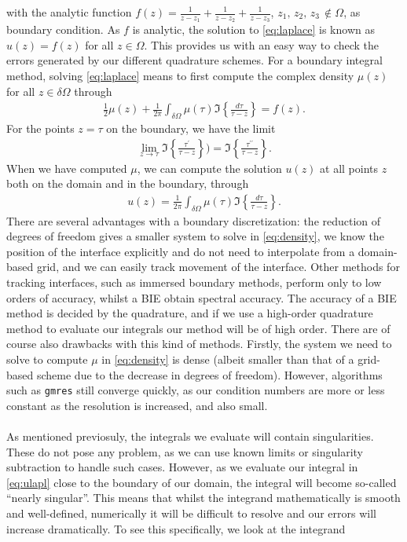 \documentclass[a4paper,10pt]{article}
\begin{document}
with the analytic function $f(z)=\frac{1}{z-z_1}+\frac{1}{z-z_2} + \frac{1}{z-z_3}$, $z_1,\,z_2,\,z_3\,\notin\Omega$, as boundary condition. As $f$ is analytic, the solution to \eqref{eq:laplace} is known as $u(z)=f(z)$ for all $z\in\Omega$. This provides us with an easy way to check the errors generated by our different quadrature schemes. For a boundary integral method, solving \eqref{eq:laplace} means to first compute the complex density $\mu(z)$ for all $z\in\delta\Omega$ through
\begin{align}
	\frac{1}{2}\mu(z) + \frac{1}{2\pi}\int_{\delta\Omega} \mu(\tau) \Im\left\{ \frac{d\tau}{\tau-z}\right\} = f(z).
	\label{eq:density}
\end{align}
For the points $z = \tau$ on the boundary, we have the limit 
\begin{align*}
\lim_{z\rightarrow\tau} \Im\left\{ \frac{\tau^\prime}{\tau-z}\right\} ) = \Im\left\{ \frac{\tau^{\prime\prime}}{\tau-z} \right\}.
\end{align*}
When we have computed $\mu$, we can compute the solution $u(z)$ at all points $z$ both on the domain and in the boundary, through
\begin{align}
	u(z) = \frac{1}{2\pi} \int_{\delta\Omega} \mu(\tau) \Im\left\{ \frac{d\tau}{\tau-z} \right\}.
\label{eq:ulapl}
\end{align}
There are several advantages with a boundary discretization: the reduction of degrees of freedom gives a smaller system to solve in \eqref{eq:density}, we know the position of the interface explicitly and do not need to interpolate from a domain-based grid, and we can easily track movement of the interface. Other methods for tracking interfaces, such as immersed boundary methods, perform only to low orders of accuracy, whilst a BIE obtain spectral accuracy. The accuracy of a BIE method is decided by the quadrature, and if we use  a high-order quadrature method to evaluate our integrals our method will be of high order. There are of course also drawbacks with this kind of methods. Firstly, the system we need to solve to compute $\mu$ in \eqref{eq:density} is dense (albeit smaller than that of a grid-based scheme due to the decrease in degrees of freedom). However, algorithms such as \texttt{gmres} still converge quickly, as our condition numbers are more or less constant as the resolution is increased, and also small. 
\\ \\
As mentioned previosuly, the integrals we evaluate will contain singularities. These do not pose any problem, as we can use known limits or singularity subtraction to handle such cases. However, as we evaluate our integral in \eqref{eq:ulapl} close to the boundary of our domain, the integral will become so-called ``nearly singular''. This means that whilst the integrand mathematically is smooth and well-defined, numerically it will be difficult to resolve and our errors will increase dramatically. To see this specifically, we look at the integrand
\end{document}
